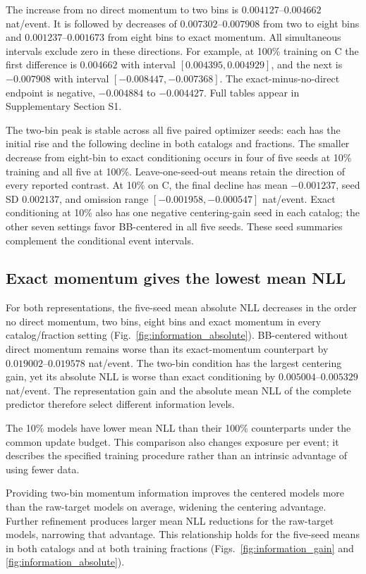 \documentclass[twocolumn,epjc3]{svjour3}
\begin{document}
The increase from no direct momentum to two bins is
$0.004127$--$0.004662$ nat/event. It is followed by decreases of
$0.007302$--$0.007908$ from two to eight bins and
$0.001237$--$0.001673$ from eight bins to exact momentum. All simultaneous
intervals exclude zero in these directions. For example, at 100\% training
on C the first difference is $0.004662$ with interval
$[0.004395,0.004929]$, and the next is $-0.007908$ with interval
$[-0.008447,-0.007368]$. The exact-minus-no-direct endpoint is negative,
$-0.004884$ to $-0.004427$. Full tables appear in Supplementary Section S1.

The two-bin peak is stable across all five paired optimizer seeds: each has
the initial rise and the following decline in both catalogs and fractions.
The smaller decrease from eight-bin to exact conditioning occurs in four of
five seeds at 10\% training and all five at 100\%. Leave-one-seed-out means
retain the direction of every reported contrast. At 10\% on C, the final
decline has mean $-0.001237$, seed SD $0.002137$, and omission range
$[-0.001958,-0.000547]$ nat/event. Exact conditioning at 10\% also has
one negative centering-gain seed in each catalog; the other seven settings
favor BB-centered in all five seeds. These seed summaries complement the
conditional event intervals.

\subsection{Exact momentum gives the lowest mean NLL}

For both representations, the five-seed mean absolute NLL decreases in the
order no direct momentum, two bins, eight bins and exact momentum in every
catalog/fraction setting (Fig.~\ref{fig:information_absolute}). BB-centered
without direct momentum remains worse than its exact-momentum counterpart
by $0.019002$--$0.019578$ nat/event. The two-bin condition has the largest
centering gain, yet its absolute NLL is worse than exact conditioning by
$0.005004$--$0.005329$ nat/event. The representation gain and the absolute
mean NLL of the complete predictor therefore select different information levels.

The 10\% models have lower mean NLL than their 100\% counterparts under
the common update budget. This comparison also changes exposure per event;
it describes the specified training procedure rather than an intrinsic
advantage of using fewer data.

Providing two-bin momentum information improves the centered models more
than the raw-target models on average, widening the centering advantage.
Further refinement produces larger mean NLL reductions for the raw-target
models, narrowing that advantage. This relationship holds for the five-seed
means in both catalogs and at both training fractions
(Figs.~\ref{fig:information_gain} and \ref{fig:information_absolute}).
\end{document}
